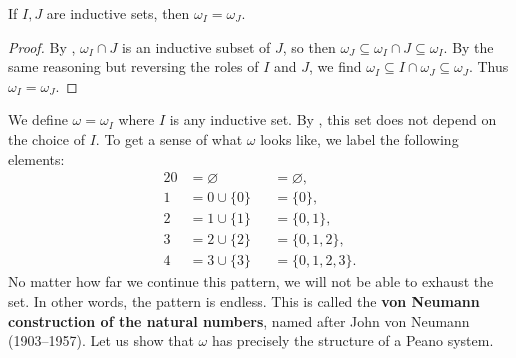 \begin{prop}\label{ch1thm_inductive_unique}
	If $I, J$ are inductive sets, then $\omega_{I} = \omega_{J}$.
\end{prop}
\begin{proof}
	By , $\omega_{I}\cap J$ is an inductive subset of $J$, so then $\omega_{J}\subseteq\omega_{I}\cap J\subseteq\omega_{I}$.
	By the same reasoning but reversing the roles of $I$ and $J$, we find $\omega_{I}\subseteq I\cap\omega_{J}\subseteq\omega_{J}$.
	Thus $\omega_{I} = \omega_{J}$.
\end{proof}

We define $\omega = \omega_{I}$ where $I$ is any inductive set.
By , this set does not depend on the choice of $I$. 
To get a sense of what $\omega$ looks like, we label the following elements:
\begin{alignat*}{2}
	0 &= \varnothing &&= \varnothing, \\
	1 &= 0 \cup \{0\} &&= \{0\}, \\
	2 &= 1 \cup \{1\} &&= \{0, 1\}, \\
	3 &= 2 \cup \{2\} &&= \{0, 1, 2\}, \\
	4 &= 3 \cup \{3\} &&= \{0, 1, 2, 3\}.
\end{alignat*}
No matter how far we continue this pattern, we will not be able to exhaust the set. 
In other words, the pattern is endless. 
This is called the \textbf{von Neumann construction of the natural numbers}, named after John von Neumann (1903--1957).
Let us show that $\omega$ has precisely the structure of a Peano system.

